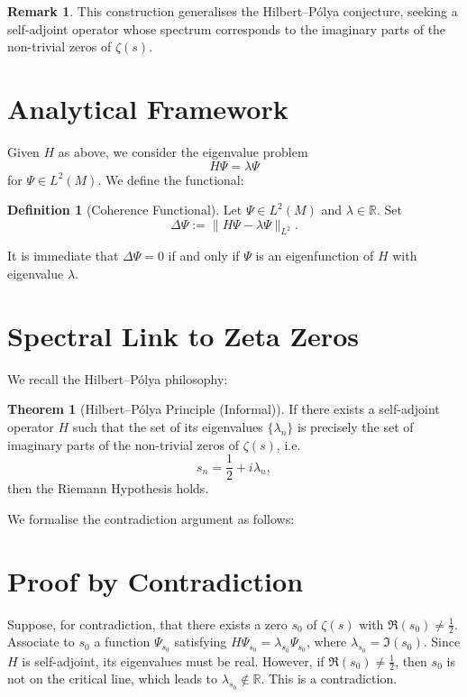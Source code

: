 \documentclass[12pt]{article}
\theoremstyle{definition}
\newtheorem{definition}{Definition}
\newtheorem{theorem}{Theorem}
\newtheorem{remark}{Remark}
\begin{document}
\begin{remark}
This construction generalises the Hilbert–Pólya conjecture, seeking a self-adjoint operator whose spectrum corresponds to the imaginary parts of the non-trivial zeros of $\zeta(s)$.
\end{remark}

\section{Analytical Framework}

Given $H$ as above, we consider the eigenvalue problem
\[
H \Psi = \lambda \Psi
\]
for $\Psi \in L^2(M)$. We define the functional:

\begin{definition}[Coherence Functional]
Let $\Psi \in L^2(M)$ and $\lambda \in \mathbb{R}$. Set
\[
\Delta\Psi := \| H\Psi - \lambda\Psi \|_{L^2}.
\]
\end{definition}

It is immediate that $\Delta\Psi=0$ if and only if $\Psi$ is an eigenfunction of $H$ with eigenvalue $\lambda$.

\section{Spectral Link to Zeta Zeros}

We recall the Hilbert–Pólya philosophy:

\begin{theorem}[Hilbert–Pólya Principle (Informal)]
If there exists a self-adjoint operator $H$ such that the set of its eigenvalues $\{ \lambda_n \}$ is precisely the set of imaginary parts of the non-trivial zeros of $\zeta(s)$, i.e.
\[
s_n = \frac{1}{2} + i\lambda_n,
\]
then the Riemann Hypothesis holds.
\end{theorem}

We formalise the contradiction argument as follows:

\section{Proof by Contradiction}

Suppose, for contradiction, that there exists a zero $s_0$ of $\zeta(s)$ with $\Re(s_0) \neq \frac{1}{2}$. Associate to $s_0$ a function $\Psi_{s_0}$ satisfying $H\Psi_{s_0} = \lambda_{s_0} \Psi_{s_0}$, where $\lambda_{s_0} = \Im(s_0)$. Since $H$ is self-adjoint, its eigenvalues must be real. However, if $\Re(s_0) \neq \frac{1}{2}$, then $s_0$ is not on the critical line, which leads to $\lambda_{s_0} \notin \mathbb{R}$. This is a contradiction.
\end{document}

